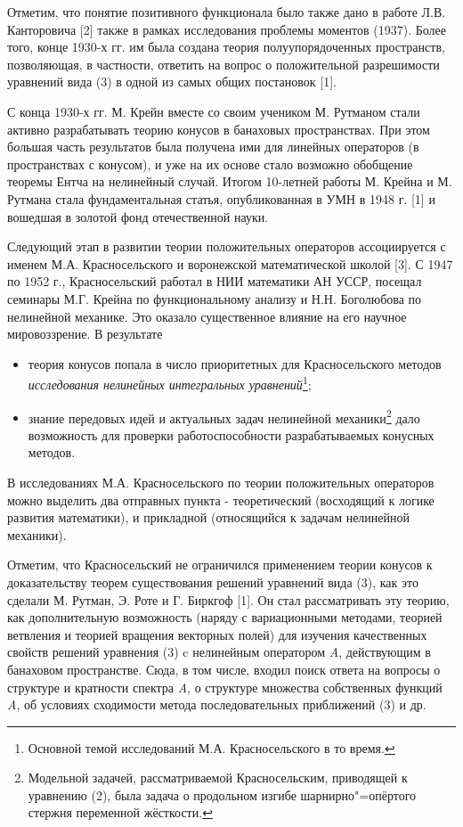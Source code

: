 Отметим, что понятие позитивного функционала было также дано в работе Л.В. Канторовича [2] также в рамках исследования проблемы моментов (1937). Более того, конце 1930-х гг. им была создана теория полуупорядоченных пространств, позволяющая, в частности, ответить на вопрос о положительной разрешимости уравнений вида (3) в одной из самых общих постановок [1].

С конца 1930-х гг. М. Крейн вместе со своим учеником М. Рутманом стали активно разрабатывать теорию конусов в банаховых пространствах. При этом б\textit{о}льшая часть результатов была получена ими для линейных операторов (в пространствах с конусом), и уже на их основе стало возможно обобщение теоремы Ентча на нелинейный случай. Итогом 10-летней работы М. Крейна и М. Рутмана стала фундаментальная статья, опубликованная в УМН в 1948 г. [1] и вошедшая в золотой фонд отечественной науки.

Следующий этап в развитии теории положительных операторов ассоциируется с именем М.А. Красносельского и воронежской математической школой [3]. С 1947 по 1952 г., Красносельский работал в НИИ математики АН УССР, посещал семинары М.Г. Крейна по функциональному анализу и Н.Н. Боголюбова по нелинейной механике. Это оказало существенное влияние на его научное мировоззрение. В результате
\begin{itemize}
	\item теория конусов попала в число приоритетных для Красносельского методов \textit{исследования нелинейных интегральных уравнений}\footnote{Основной темой  исследований М.А. Красносельского в то время.};
		\item знание передовых идей и актуальных задач нелинейной механики\footnote{Модельной задачей, рассматриваемой Красносельским, приводящей к уравнению (2), была задача о продольном изгибе шарнирно"=опёртого стержня переменной жёсткости.} дало возможность для проверки работоспособности разрабатываемых конусных методов.
	\end{itemize}
В исследованиях М.А. Красносельского по теории положительных операторов можно выделить два отправных пункта - теоретический (восходящий к логике развития математики), и прикладной (относящийся к задачам нелинейной механики).

	Отметим, что Красносельский не ограничился применением теории конусов к доказательству теорем существования решений уравнений вида (3), как это сделали М. Рутман, Э. Роте и Г. Биркгоф [1]. Он стал рассматривать эту теорию, как дополнительную возможность (наряду с вариационными методами, теорией ветвления и теорией вращения векторных полей) для изучения качественных свойств решений уравнения (3) c нелинейным оператором \textit{A}, действующим в банаховом пространстве. Сюда, в том числе, входил поиск ответа на вопросы о структуре и кратности спектра \textit{A}, о структуре множества собственных функций \textit{A}, об условиях сходимости метода последовательных приближений (3) и др.

